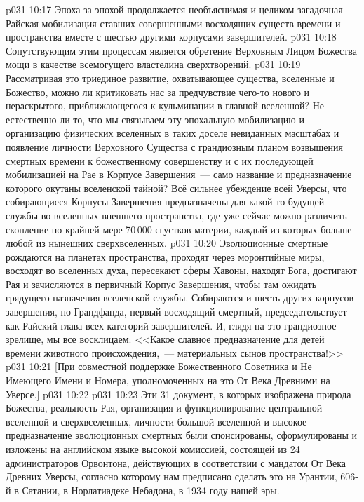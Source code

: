 \vs p031 10:17 Эпоха за эпохой продолжается необъяснимая и целиком загадочная Райская мобилизация ставших совершенными восходящих существ времени и пространства вместе с шестью другими корпусами завершителей.
\vs p031 10:18 Сопутствующим этим процессам является обретение Верховным Лицом Божества мощи в качестве всемогущего властелина сверхтворений.
\vs p031 10:19 \pc Рассматривая это триединое развитие, охватывающее существа, вселенные и Божество, можно ли критиковать нас за предчувствие чего\hyp{}то нового и нераскрытого, приближающегося к кульминации в главной вселенной? Не естественно ли то, что мы связываем эту эпохальную мобилизацию и организацию физических вселенных в таких доселе невиданных масштабах и появление личности Верховного Существа с грандиозным планом возвышения смертных времени к божественному совершенству и с их последующей мобилизацией на Рае в Корпусе Завершения~--- само название и предназначение которого окутаны вселенской тайной? Всё сильнее убеждение всей Уверсы, что собирающиеся Корпусы Завершения предназначены для какой\hyp{}то будущей службы во вселенных внешнего пространства, где уже сейчас можно различить скопление по крайней мере 70\,000 сгустков материи, каждый из которых больше любой из нынешних сверхвселенных.
\vs p031 10:20 \pc Эволюционные смертные рождаются на планетах пространства, проходят через моронтийные миры, восходят во вселенных духа, пересекают сферы Хавоны, находят Бога, достигают Рая и зачисляются в первичный Корпус Завершения, чтобы там ожидать грядущего назначения вселенской службы. Собираются и шесть других корпусов завершения, но Грандфанда, первый восходящий смертный, председательствует как Райский глава всех категорий завершителей. И, глядя на это грандиозное зрелище, мы все восклицаем: <<Какое славное предназначение для детей времени животного происхождения,~--- материальных сынов пространства!>>
\vsetoff
\vs p031 10:21 [При совместной поддержке Божественного Советника и Не Имеющего Имени и Номера, уполномоченных на это От Века Древними на Уверсе.]
\vs p031 10:22 \separatorline
\vs p031 10:23 Эти 31 документ, в которых изображена природа Божества, реальность Рая, организация и функционирование центральной вселенной и сверхвселенных, личности большой вселенной и высокое предназначение эволюционных смертных были спонсированы, сформулированы и изложены на английском языке высокой комиссией, состоящей из 24 администраторов Орвонтона, действующих в соответствии с мандатом От Века Древних Уверсы, согласно которому нам предписано сделать это на Урантии, 606\hyp{}й в Сатании, в Норлатиадеке Небадона, в 1934 году нашей эры.
\quizlink
